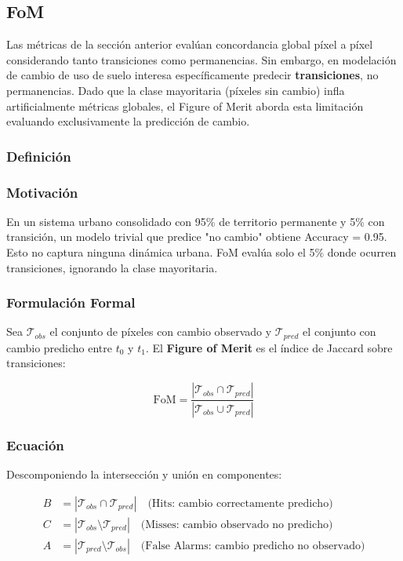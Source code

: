 \subsection{FoM}

Las métricas de la sección anterior evalúan concordancia global píxel a píxel considerando tanto transiciones como permanencias. Sin embargo, en modelación de cambio de uso de suelo interesa específicamente predecir \textbf{transiciones}, no permanencias. Dado que la clase mayoritaria (píxeles sin cambio) infla artificialmente métricas globales, el Figure of Merit aborda esta limitación evaluando exclusivamente la predicción de cambio.

\subsubsection{Definición}

\subsubsection{Motivación}

En un sistema urbano consolidado con 95\% de territorio permanente y 5\% con transición, un modelo trivial que predice "no cambio" obtiene Accuracy = 0.95. Esto no captura ninguna dinámica urbana. FoM evalúa solo el 5\% donde ocurren transiciones, ignorando la clase mayoritaria.

\subsubsection{Formulación Formal}

Sea $\mathcal{T}_{obs}$ el conjunto de píxeles con cambio observado y $\mathcal{T}_{pred}$ el conjunto con cambio predicho entre $t_0$ y $t_1$. El \textbf{Figure of Merit} es el índice de Jaccard sobre transiciones:

\begin{equation}
\text{FoM} = \frac{|\mathcal{T}_{obs} \cap \mathcal{T}_{pred}|}{|\mathcal{T}_{obs} \cup \mathcal{T}_{pred}|}
\label{eq:fom_jaccard}
\end{equation}

\subsubsection{Ecuación}

Descomponiendo la intersección y unión en componentes:

\begin{align}
B &= |\mathcal{T}_{obs} \cap \mathcal{T}_{pred}| \quad \text{(Hits: cambio correctamente predicho)} \\
C &= |\mathcal{T}_{obs} \setminus \mathcal{T}_{pred}| \quad \text{(Misses: cambio observado no predicho)} \\
A &= |\mathcal{T}_{pred} \setminus \mathcal{T}_{obs}| \quad \text{(False Alarms: cambio predicho no observado)}
\end{align}

